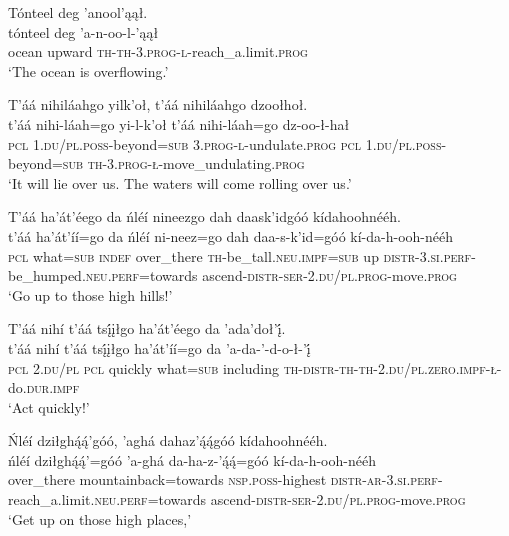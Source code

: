 \ea\label{ex:text6-11-9}
Tónteel deg ’anool’ąął.\\
\gll tónteel	deg	’a-n-oo-l-’ąął\\
     ocean	upward	\textsc{th}-\textsc{th}-3.\textsc{prog}-\textsc{l}-reach\_a.limit.\textsc{prog}\\
\glt `The ocean is overflowing.'
\z

\ea\label{ex:text6-11-10}
T’áá nihiláahgo yilk’oł, t’áá nihiláahgo dzoołhoł.\\
\gll t’áá	nihi-láah=go	yi-l-k’oł	t’áá	nihi-láah=go	dz-oo-ł-hał\\
     \textsc{pcl}	1.\textsc{du}/\textsc{pl}.\textsc{poss}-beyond=\textsc{sub}	3.\textsc{prog}-\textsc{l}-undulate.\textsc{prog}	\textsc{pcl}	1.\textsc{du}/\textsc{pl}.\textsc{poss}-beyond=\textsc{sub}	\textsc{th}-3.\textsc{prog}-\textsc{ł}-move\_undulating.\textsc{prog}\\
\glt `It will lie over us. The waters will come rolling over us.'
\z

\ea\label{ex:text6-11-11}
T’áá ha’át’éego da ńléí nineezgo dah daask’idgóó kídahoohnééh.\\
\gll t’áá	ha’át’íí=go	da	ńléí	ni-neez=go	dah	daa-s-k’id=góó	kí-da-h-ooh-nééh\\
     \textsc{pcl}	what=\textsc{sub}	\textsc{indef}	over\_there	\textsc{th}-be\_tall.\textsc{neu}.\textsc{impf}=\textsc{sub}	up	\textsc{distr}-3.\textsc{si}.\textsc{perf}-be\_humped.\textsc{neu}.\textsc{perf}=towards	ascend-\textsc{distr}-\textsc{ser}-2.\textsc{du}/\textsc{pl}.\textsc{prog}-move.\textsc{prog}\\
\glt `Go up to those high hills!'
\z

\ea\label{ex:text6-11-12}
T’áá nihí t’áá tsį́įłgo ha’át’éego da ’ada’doł’į́.\\
\gll t’áá	nihí	t’áá	tsį́įłgo	ha’át’íí=go	da	’a-da-’-d-o-ł-’į́\\
     \textsc{pcl}	2.\textsc{du}/\textsc{pl}	\textsc{pcl}	quickly	what=\textsc{sub}	including	\textsc{th}-\textsc{distr}-\textsc{th}-\textsc{th}-2.\textsc{du}/\textsc{pl}.\textsc{zero}.\textsc{impf}-\textsc{ł}-do.\textsc{dur}.\textsc{impf}\\
\glt `Act quickly!'
\z

\ea\label{ex:text6-11-13}
Ńléí dziłghą́ą́’góó, ’aghá dahaz’ą́ą́góó kídahoohnééh.\\
\gll ńléí	dziłghą́ą́’=góó	’a-ghá	da-ha-z-’ą́ą́=góó	kí-da-h-ooh-nééh\\
     over\_there	mountainback=towards	\textsc{nsp}.\textsc{poss}-highest	\textsc{distr}-\textsc{ar}-3.\textsc{si}.\textsc{perf}-reach\_a.limit.\textsc{neu}.\textsc{perf}=towards	ascend-\textsc{distr}-\textsc{ser}-2.\textsc{du}/\textsc{pl}.\textsc{prog}-move.\textsc{prog}\\
\glt `Get up on those high places,'
\z

